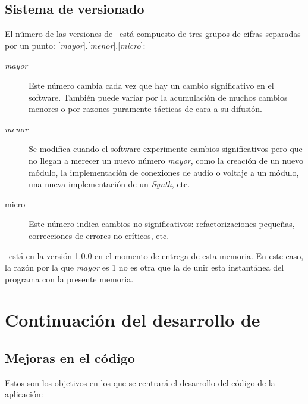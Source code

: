 \subsection{Sistema de versionado}

El número de las versiones de \appName~está compuesto de tres grupos de cifras separadas por un punto: [\textit{mayor}].[\textit{menor}].[\textit{micro}]:

\begin{description} 
	\item[\textit{mayor}] Este número cambia cada vez que hay un cambio significativo en el software.  También puede variar por la acumulación de muchos cambios menores o por razones puramente tácticas de cara a su difusión.
	\item[\textit{menor}] Se modifica cuando el software experimente cambios significativos pero que no llegan a merecer un nuevo número \textit{mayor}, como la creación de un nuevo módulo, la implementación de conexiones de audio o voltaje a un módulo, una nueva implementación de un \textit{Synth}, etc.
	\item[micro] Este número indica cambios no significativos: refactorizaciones pequeñas, correcciones de errores no críticos, etc.
\end{description}

\appName~está en la versión 1.0.0 en el momento de entrega de esta memoria. En este caso, la razón por la que \textit{mayor} es 1 no es otra que la de unir esta instantánea del programa con la presente memoria.


\section[Continuación del desarrollo]{Continuación del desarrollo de \appName {}}


\subsection{Mejoras en el código}
Estos son los objetivos en los que se centrará el desarrollo del código de la aplicación:

